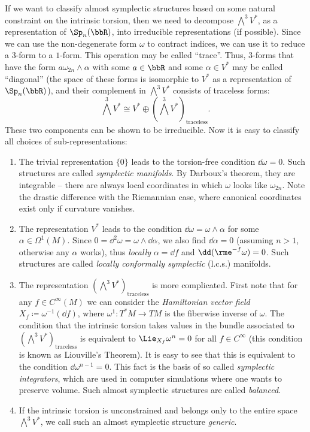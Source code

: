 \begin{example}
    If we want to classify almost symplectic structures based on some natural constraint on the intrinsic torsion, then we need to decompose $\bigwedge^3 V^\ast$, as a representation of $\Sp_{n}(\bbR)$, into irreducible representations (if possible). Since we can use the non-degenerate form $\omega$ to contract indices, we can use it to reduce a $3$-form to a $1$-form. This operation may be called ``trace''. Thus, $3$-forms that have the form $a\omega_{2n}\wedge\alpha$ with some $a\in\bbR$ and some $\alpha\in V^\ast$ may be called ``diagonal'' (the space of these forms is isomorphic to $V^\ast$ as a representation of $\Sp_n(\bbR)$), and their complement in $\bigwedge^3 V^\ast$ consists of traceless forms:
    \[\bigwedge^3 V^\ast \cong V^\ast\oplus \left(\bigwedge^3 V^\ast\right)_{\mathrm{traceless}}.\]
    These two components can be shown to be irreducible. Now it is easy to classify all choices of sub-representations:
    \begin{enumerate}
        \item The trivial representation $\{0\}$ leads to the torsion-free condition $\dd\omega=0$. Such structures are called \emph{symplectic manifolds}. By Darboux's theorem, they are integrable -- there are always local coordinates in which $\omega$ looks like $\omega_{2n}$. Note the drastic difference with the Riemannian case, where canonical coordinates exist only if curvature vanishes.
        \item The representation $V^\ast$ leads to the condition $\dd\omega=\omega\wedge \alpha$ for some $\alpha\in\Omega^1(M)$. Since $0=\dd^2\omega=\omega\wedge\dd\alpha$, we also find $\dd\alpha=0$ (assuming $n>1$, otherwise any $\alpha$ works), thus \emph{locally} $\alpha=\dd f$ and $\dd (\rme^{-f}\omega)=0$. Such structures are called \emph{locally conformally symplectic} (l.c.s.) manifolds.
        \item The representation $\left(\bigwedge^3 V^\ast\right)_{\mathrm{traceless}}$ is more complicated. First note that for any $f\in C^\infty(M)$ we can consider the \emph{Hamiltonian vector field} $X_f\coloneqq \omega^{-1}(\dd f)$, where $\omega^1:T^\ast M\to TM$ is the fiberwise inverse of $\omega$. The condition that the intrinsic torsion takes values in the bundle associated to $\left(\bigwedge^3 V^\ast\right)_{\mathrm{traceless}}$ is equivalent to $\Lie_{X_f}\omega^n=0$ for all $f\in C^\infty$ (this condition is known as Liouville's Theorem). It is easy to see that this is equivalent to the condition $\dd\omega^{n-1}=0$. This fact is the basis of so called \emph{symplectic integrators}, which are used in computer simulations where one wants to preserve volume. Such almost symplectic structures are called \emph{balanced}.
        \item If the intrinsic torsion is unconstrained and belongs only to the entire space $\bigwedge^3 V^\ast$, we call such an almost symplectic structure \emph{generic}.
    \end{enumerate}
\end{example}







